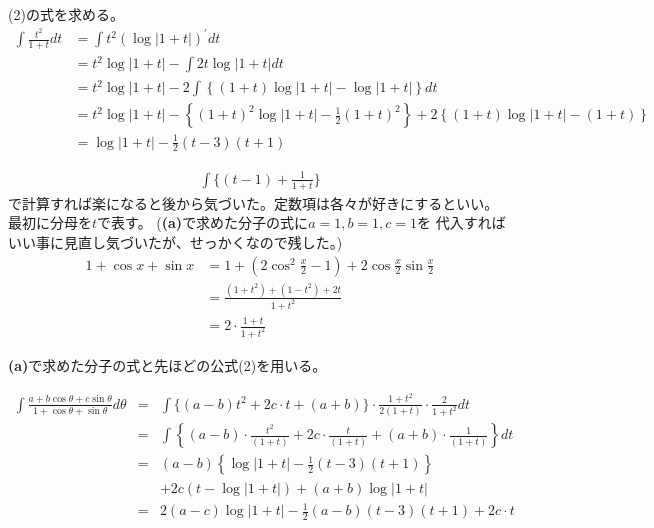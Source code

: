 \documentclass [15pt,titlepage]{jarticle}
\begin{document}
(2)の式を求める。
\begin{align*}
\int\frac{t^2}{1+t}dt
	&=
\int t^2\left(\log\lvert1+t\rvert\right)^\prime dt	\\
	&=
t^2\log\lvert1+t\rvert-\int 2t\log\lvert1+t\rvert dt\\
	&=
t^2\log\lvert1+t\rvert-
	2\int 
	\left\{(1+t)\log\lvert1+t\rvert -\log\lvert1+t\rvert \right\}dt\\
	&=
t^2\log\lvert1+t\rvert
-\left\{
	(1+t)^2\log \lvert1+t\rvert-\frac{1}{2}(1+t)^2
\right\}
+2\left\{(1+t)\log\lvert1+t\rvert-(1+t)\right\}\\
	&=\log\lvert1+t\rvert-\frac{1}{2}(t-3)(t+1)
\end{align*}

\begin{align*}
\int \{
	(t-1)+\frac{1}{1+t}
	\}
\end{align*}
で計算すれば楽になると後から気づいた。定数項は各々が好きにするといい。\\

\newpage
最初に分母を$t$で表す。
(\textbf{(a)}で求めた分子の式に$a=1,b=1,c=1$を
代入すればいい事に見直し気づいたが、せっかくなので残した。)
\begin{align*}
1+\cos x+\sin x 
	&=1+(2\cos^2\frac{x}{2}-1)+2\cos\frac{x}{2}\sin\frac{x}{2}\\
	&=\frac{(1+t^2)+(1-t^2)+2t}{1+t^2}\\
	&=2\cdot\frac{1+t}{1+t^2}
\end{align*}

\textbf{(a)}で求めた分子の式と先ほどの公式(2)を用いる。

\begin{eqnarray*}
\displaystyle
	\int\frac{a+b\cos\theta+c\sin\theta}
			{1+\cos\theta+\sin\theta}d\theta
	&=&
	\int\{(a-b)t^2+2c\cdot t+(a+b)\}\cdot\frac{1+t^2}{2(1+t)}\cdot\frac{2}{1+t^2}dt\\
	&=&
	\int
	\left\{(a-b)\cdot\frac{t^2}{(1+t)}+2c\cdot\frac{t}{(1+t)}+(a+b)\cdot\frac{1}{(1+t)}\right\}dt\\
	&=&
	(a-b)\left\{\log\lvert1+t\rvert-\frac{1}{2}(t-3)(t+1)\right\}\\
	&　&+2c\left(t-\log\lvert1+t\rvert\right)+(a+b)\log\lvert1+t\rvert\\
	&=&
2(a-c)\log\lvert1+t\rvert
-\frac{1}{2}(a-b)(t-3)(t+1)+2c\cdot t
\end{eqnarray*}
\end{document}
